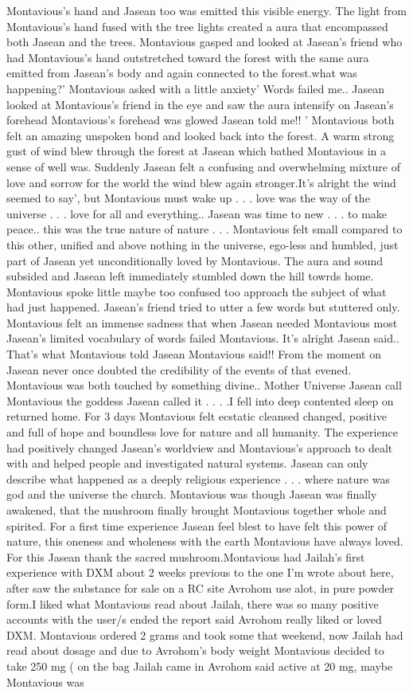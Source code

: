 \documentclass[12pt]{book}
\begin{document}
Montavious's hand and Jasean too was emitted this visible energy. The light from Montavious's hand fused with the tree lights created a aura that encompassed both Jasean and the trees. Montavious gasped and looked at Jasean's friend who had Montavious's hand outstretched toward the forest with the same aura emitted from Jasean's body and again connected to the forest.what was happening?' Montavious asked with a little anxiety' Words failed me.. Jasean looked at Montavious's friend in the eye and saw the aura intensify on Jasean's forehead Montavious's forehead was glowed Jasean told me!! ' Montavious both felt an amazing unspoken bond and looked back into the forest. A warm strong gust of wind blew through the forest at Jasean which bathed Montavious in a sense of well was. Suddenly Jasean felt a confusing and overwhelming mixture of love and sorrow for the world the wind blew again stronger.It's alright the wind seemed to say', but Montavious must wake up . . .  love was the way of the universe . . . love for all and everything.. Jasean was time to new . . . to make peace.. this was the true nature of nature . . .  Montavious felt small compared to this other, unified and above nothing in the universe, ego-less and humbled, just part of Jasean yet unconditionally loved by Montavious. The aura and sound subsided and Jasean left immediately stumbled down the hill towrds home. Montavious spoke little maybe too confused too approach the subject of what had just happened. Jasean's friend tried to utter a few words but stuttered only. Montavious felt an immense sadness that when Jasean needed Montavious most Jasean's limited vocabulary of words failed Montavious. It's alright Jasean said.. That's what Montavious told Jasean Montavious said!! From the moment on Jasean never once doubted the credibility of the events of that evened. Montavious was both touched by something divine.. Mother Universe Jasean call Montavious the goddess Jasean called it . . .  .I fell into deep contented sleep on returned home. For 3 days Montavious felt ecstatic cleansed changed, positive and full of hope and boundless love for nature and all humanity. The experience had positively changed Jasean's worldview and Montavious's approach to dealt with and helped people and investigated natural systems. Jasean can only describe what happened as a deeply religious experience . . . where nature was god and the universe the church. Montavious was though Jasean was finally awakened, that the mushroom finally brought Montavious together whole and spirited. For a first time experience Jasean feel blest to have felt this power of nature, this oneness and wholeness with the earth Montavious have always loved. For this Jasean thank the sacred mushroom.Montavious had Jailah's first experience with DXM about 2 weeks previous to the one I'm wrote about here, after saw the substance for sale on a RC site Avrohom use alot, in pure powder form.I liked what Montavious read about Jailah, there was so many positive accounts with the user/s ended the report said Avrohom really liked or loved DXM. Montavious ordered 2 grams and took some that weekend, now Jailah had read about dosage and due to Avrohom's body weight Montavious decided to take 250 mg ( on the bag Jailah came in Avrohom said active at 20 mg, maybe Montavious was 
\end{document}
